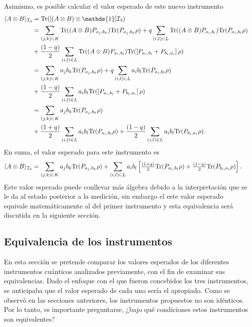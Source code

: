 Asimismo, es posible calcular el valor esperado de este nuevo instrumento \begin{equation*}
    \begin{split}
        \la A\otimes B \ra_{\mathcal{I}_3}&=\tr([(A\otimes B) \otimes \mathds{1}]\mathcal{I}_3)\\
        &=\sum_{(j,k)\in K} \tr((A\otimes B )P_{a_j,b_k})\tr(P_{a_j,b_k}\rho)+q\sum_{(i,l)\in L}\tr((A\otimes B)P_{a_i,b_l}) \tr(P_{a_i,b_l}\rho)\\
        &+\dfrac{(1-q)}{2}\sum_{(i,l) \in L}\tr((A\otimes B )P_{a_i,b_l}) \tr(\left[P_{a_i,b_l}+P_{b_l,a_i}\right]\rho)\\
        &=\sum_{(j,k)\in K} a_j b_k\tr(P_{a_j,b_k}\rho)+q\sum_{(i,l)\in L}a_i b_l \tr(P_{a_i,b_l}\rho)\\
        &+\dfrac{(1-q)}{2}\sum_{(i,l) \in L} a_i b_l\tr(\left[P_{a_i,b_l}+P_{b_l,a_i}\right]\rho)\\
        &=\sum_{(j,k)\in K} a_j b_k \tr(P_{a_j, b_k}\rho)\\
        &+\dfrac{(1+q)}{2}\sum_{(i,l)\in L}a_i b_l \tr(P_{a_i,b_l}\rho) +\dfrac{(1-q)}{2}\sum_{(i,l) \in L}a_i b_l \tr(P_{b_l, a_i}\rho).
    \end{split}
\end{equation*}En suma, el valor esperado para este instrumento es \begin{equation}\label{eq:expectedValueThirdInstrument2p}
    \begin{split}
        \langle A\otimes B \rangle_{\mathcal{I}_3}&=\sum_{(j,k)\in K} a_j b_k {\rm Tr}(P_{a_j, b_k}\rho)+\sum_{(i,l)\in L}a_i b_l \left[\tfrac{(1+q)}{2} {\rm Tr}(P_{a_i,b_l}\rho) +\tfrac{(1-q)}{2}{\rm Tr}(P_{b_l, a_i}\rho)\right].
    \end{split}
\end{equation} Este valor esperado puede conllevar más álgebra debido a la interpretación que se le da al estado posterior a la medición, sin embargo el  este valor esperado equivale matemáticamente al del primer instrumento y esta equivalencia será discutida en la siguiente sección. 






\subsection{Equivalencia de los instrumentos}\label{subsec:Equivalencia } %

En esta sección se pretende comparar los valores esperados de los diferentes
instrumentos cuánticos analizados previamente, con el fin de examinar sus
equivalencias.  Dado el enfoque con el que fueron concebidos los tres
instrumentos, se anticipaba que el valor esperado de cada uno sería el
apropiado. Como se observó en las secciones anteriores, los instrumentos
propuestos no son idénticos. Por lo tanto, es importante preguntarse, ¿bajo qué
condiciones estos instrumentos son equivalentes?



